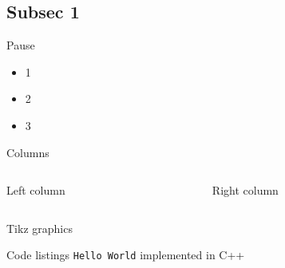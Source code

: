 \documentclass[compress,aspectratio=169]{beamer}
\begin{document}
\subsection{Subsec 1} %
\begin{frame}{Pause}
    \begin{itemize}
        \item 1
        \pause  %
        \item 2
        \pause
        \item 3
    \end{itemize}
\end{frame}

\begin{frame}{Columns}
    \begin{columns}
    \begin{column}{0.5\textwidth}
    Left column
    \end{column}
    \begin{column}{0.5\textwidth}
    Right column %
    \end{column}
    \end{columns}
\end{frame}

\begin{frame}{Tikz graphics}
\end{frame}

\begin{frame}[fragile]{Code listings}
    \texttt{Hello World} implemented in C++
    
    \begin{tcolorbox}[title=C++]
        \footnotesize\inputminted[xleftmargin=1em,linenos]{c++}{../assets/hello-world.cpp}
    \end{tcolorbox}

\end{frame}
\end{document}
